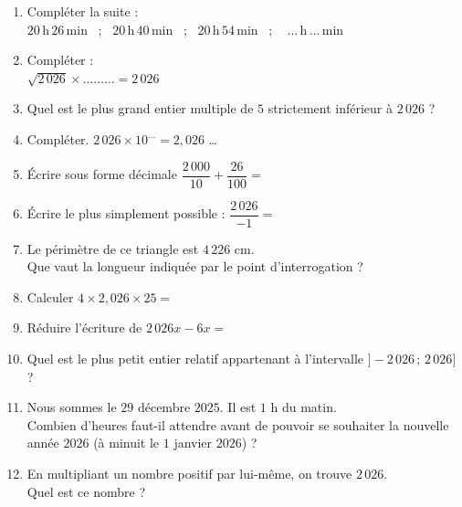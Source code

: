 \documentclass[a4paper,11pt]{article}
\begin{document}
\begin{seance}{}
\begin{enumerate}
    	$\square\;$ OUI\qquad $\square\;$ NON\qquad \\

	\item Compléter la suite : \\
         $20\,\text{h}\,26\,\text{min}$ \,\,\,; \,\,\,$20\,\text{h}\,40\,\text{min}$ \,\,\,; \,\,\,$20\,\text{h}\,54\,\text{min}$ \,\,\,; \,\,\, $\ldots\,\text{h}\,\ldots\,\text{min}$
	\item Compléter :\\$\sqrt{2\,026}\times \ldots\ldots\ldots =2\,026$
	\item Quel est le plus grand entier multiple de $5$ strictement inférieur à $2\,026$ ?
	\item Compléter.
\smallskip
$2\,026 \times 10^{\ldots} =2{,}026$ \ldots
	\item Écrire sous forme décimale $\dfrac{2\,000}{10}+\dfrac{26}{100}=$\dotfill
	\item Écrire le plus simplement possible : $\dfrac{2\,026}{-1}=$\dotfill
	\item Le périmètre de ce triangle est  $4\,226\text{ cm}$. \\
        Que vaut la longueur indiquée par le point d'interrogation ?\dotfill\\
	\item Calculer $4 \times 2{,}026\times 25=$\dotfill
	\item Réduire l'écriture de $2\,026x -6x=$\dotfill
	\item Quel est le plus petit entier relatif appartenant à l'intervalle $] -2\,026\,;\,2\,026]$ ? \dotfill
	\item Nous sommes le $29$ décembre $2025$. Il est $1$ h du matin.\\
            Combien  d'heures faut-il attendre avant de pouvoir se souhaiter la nouvelle année $2026$ (à minuit le $1$ janvier $2026$) ?\dotfill
	\item En multipliant un nombre positif par lui-même, on trouve $2\,026$. \\
            Quel est ce nombre ? \dotfill
            \end{enumerate}
            \end{seance}
      
\end{document}
